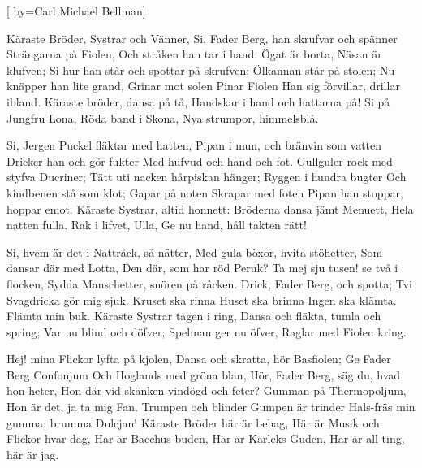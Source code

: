 


[ 	%
by={Carl Michael Bellman}]		%
	
\beginverse*		%
Käraste Bröder, Systrar och Vänner,
Si, Fader Berg, han skrufvar och spänner
Strängarna på Fiolen,
Och stråken han tar i hand.
Ögat är borta, Näsan är klufven;
Si hur han står och spottar på skrufven;
Ölkannan står på stolen;
Nu knäpper han lite grand,
Grinar mot solen
Pinar Fiolen
Han sig förvillar, drillar ibland.
Käraste bröder, dansa på tå,
Handskar i hand och hattarna på!
Si på Jungfru Lona,
Röda band i Skona,
Nya strumpor, himmelsblå.
\endverse			%

\beginverse*		%
Si, Jergen Puckel fläktar med hatten,
Pipan i mun, och bränvin som vatten
Dricker han och gör fukter
Med hufvud och hand och fot.
Gullguler rock med styfva Ducriner;
Tätt uti nacken hårpiskan hänger;
Ryggen i hundra bugter
Och kindbenen stå som klot;
Gapar på noten
Skrapar med foten 
Pipan han stoppar, hoppar emot.
Käraste Systrar, altid honnett:
Bröderna dansa jämt Menuett,
Hela natten fulla.
Rak i lifvet, Ulla,
Ge nu hand, håll takten rätt!
\endverse			%

\beginverse*		%
Si, hvem är det i Nattråck, så nätter,
Med gula böxor, hvita stöfletter,
Som dansar där med Lotta,
Den där, som har röd Peruk?
Ta mej sju tusen! se två i flocken,
Sydda Manschetter, snören på råcken.
Drick, Fader Berg, och spotta;
Tvi Svagdricka gör mig sjuk.
Kruset ska rinna 
Huset ska brinna 
Ingen ska klämta. Flämta min buk.
Käraste Systrar tagen i ring,
Dansa och fläkta, tumla och spring;
Var nu blind och döfver;
Spelman ger nu öfver,
Raglar med Fiolen kring.
\endverse			%

\beginverse*		%
Hej! mina Flickor lyfta på kjolen,
Dansa och skratta, hör Basfiolen;
Ge Fader Berg Confonjum
Och Hoglands med gröna blan,
Hör, Fader Berg, säg du, hvad hon heter,
Hon där vid skänken vindögd och feter?
Gumman på Thermopoljum,
Hon är det, ja ta mig Fan.
Trumpen och blinder 
Gumpen är trinder
Hals-fräs min gumma; brumma Dulcjan!
Käraste Bröder här är behag,
Här är Musik och Flickor hvar dag,
Här är Bacchus buden,
Här är Kärleks Guden,
Här är all ting, här är jag.
\endverse			%
\endsong			%
